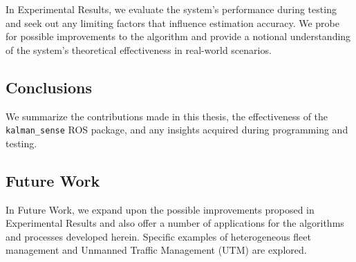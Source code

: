 In Experimental Results, we evaluate the system's performance during testing and seek out any limiting factors that influence estimation accuracy. We probe for possible improvements to the algorithm and provide a notional understanding of the system's theoretical effectiveness in real-world scenarios.

\subsection*{Conclusions}

We summarize the contributions made in this thesis, the effectiveness of the \texttt{kalman\_sense} ROS package, and any insights acquired during programming and testing. 

\subsection*{Future Work}

In Future Work, we expand upon the possible improvements proposed in Experimental Results and also offer a number of applications for the algorithms and processes developed herein. Specific examples of heterogeneous fleet management and Unmanned Traffic Management (UTM) are explored.